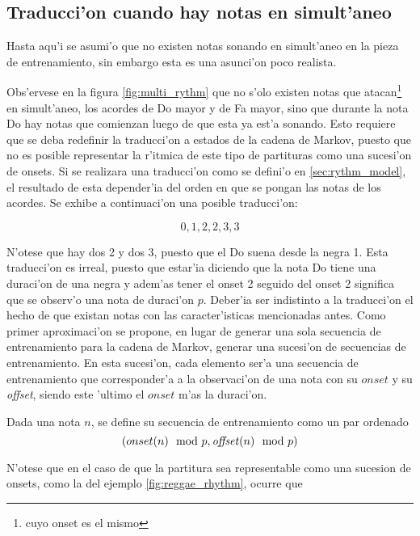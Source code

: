 \subsection{Traducci'on cuando hay notas en simult'aneo}
Hasta aqu'i se asumi'o que no existen notas sonando en simult'aneo en la pieza de entrenamiento, sin embargo esta es una asunci'on poco
realista.


\begin{imagen}
\end{imagen}

Obs'ervese en la figura \ref{fig:multi_rythm} que no s'olo existen notas que atacan\footnote{cuyo onset es el mismo} en simult'aneo, los acordes de Do mayor y de Fa mayor, 
sino que durante la nota Do hay notas que comienzan luego de que esta ya est'a sonando. Esto requiere que se deba redefinir la traducci'on
a estados de la cadena de Markov, puesto que no es posible representar la r'itmica de este tipo de partituras como una sucesi'on de onsets. 
Si se realizara una traducci'on como se defini'o en \ref{sec:rythm_model}, el resultado de esta depender'ia del orden en que se pongan
las notas de los acordes. Se exhibe a continuaci'on una posible traducci'on:

$$0, 1, 2, 2, 3, 3$$

N'otese que hay dos 2 y dos 3, puesto que el Do suena desde la negra 1. Esta traducci'on es irreal, puesto que estar'ia diciendo que la nota Do tiene
una duraci'on de una negra y adem'as tener el onset 2 seguido del onset 2 significa que se observ'o una nota de duraci'on $p$. 
Deber'ia ser indistinto a la traducci'on el hecho de que existan notas 
con las caracter'isticas mencionadas antes. Como primer aproximaci'on se propone, en lugar de generar una sola secuencia de entrenamiento para la cadena
de Markov, generar una sucesi'on de secuencias de entrenamiento. En esta sucesi'on, cada elemento ser'a una secuencia de entrenamiento
que corresponder'a a la observaci'on de una nota con su $onset$ y su \emph{offset}, siendo este 'ultimo el $onset$ m'as la duraci'on. 

\begin{definition}
\label{def:traduccion1}
Dada una nota $n$, se define su secuencia de entrenamiento como un par ordenado $$(onset(n) \mod p, \text{\emph{offset}}(n)\mod p)$$
\end{definition}

N'otese que en el caso de que la partitura sea representable como una sucesion de onsets, como la del ejemplo \ref{fig:reggae_rhythm}, ocurre que 

